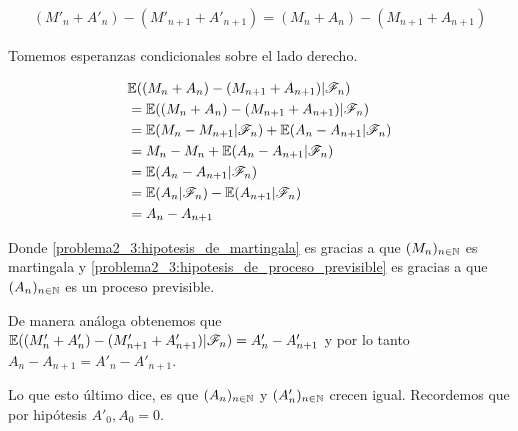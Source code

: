 \begin{align}
    (M'_n + A'_n) - (M'_{n+1} + A'_{n+1}) = (M_n + A_n) - (M_{n+1} + A_{n+1})
\end{align}\par\null

Tomemos esperanzas condicionales sobre el lado derecho.

\begin{align}
                                                    & \mathbb{E}((M_n + A_n) -( M_{n+1} + A_{n+1}) | \mathscr{F}_n)                                              \\ 
                                                    &=  \mathbb{E}((M_n + A_n) -( M_{n+1} + A_{n+1}) | \mathscr{F}_n)                                            \\
                                                    &=  \mathbb{E}(M_n - M_{n+1}| \mathscr{F}_n) + \mathbb{E}(A_n - A_{n+1} | \mathscr{F}_n)                                      \\
                                                    &=  M_n - M_{n} + \mathbb{E}(A_n - A_{n+1} | \mathscr{F}_n) \label{problema2_3:hipotesis_de_martingala}      \\
                                                    &=  \mathbb{E}(A_n - A_{n+1} | \mathscr{F}_n)                                                                \\
                                                    &=  \mathbb{E}(A_n| \mathscr{F}_n) - \mathbb{E}(A_{n+1} | \mathscr{F}_n)                                                      \\
                                                    &=  A_n - A_{n+1} \label{problema2_3:hipotesis_de_proceso_previsible}                                                                               
\end{align}\par\null

Donde \eqref{problema2_3:hipotesis_de_martingala} es gracias a que $(M_n)_{n\in\mathbb{N}}$ es martingala y \eqref{problema2_3:hipotesis_de_proceso_previsible}
es gracias a que $(A_n)_{n\in\mathbb{N}}$ es un proceso previsible.\par\null

De manera análoga obtenemos que $\mathbb{E}((M'_n + A'_n) - (M'_{n+1} + A'_{n+1}) | \mathscr{F}_n) = A'_n - A'_{n+1}$ y por lo tanto $A_n - A_{n+1} = A'_n - A'_{n+1}$.\par\null

Lo que esto último dice, es que $(A_n)_{n\in\mathbb{N}}$ y $(A'_n)_{n\in\mathbb{N}}$ crecen igual. Recordemos que por hipótesis $A'_0, A_0 = 0$.\par\null

